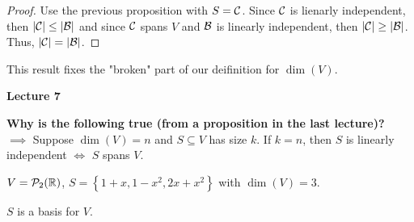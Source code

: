 \begin{proof}
    Use the previous proposition with $S = \mathcal{C}$. Since $\mathcal{C}$ is lienarly independent, then $|\mathcal{C}| \leq |\mathcal{B}|$
    and since $\mathcal{C}$ spans $V$ and $\mathcal{B}$ is linearly independent, then $|\mathcal{C}| \geq |\mathcal{B}|$. Thus, $|\mathcal{C}| = |\mathcal{B}|$.
\end{proof}

\begin{note}
    This result fixes the "broken" part of our deifinition for $\dim{(V)}$.
\end{note}

\makebox[\linewidth]{\hrulefill}
{\large \textbf{Lecture 7}}

\textbf{Why is the following true (from a proposition in the last lecture)?} \\
$\implies$ Suppose $\dim{(V)} = n$ and $S \subseteq V$ has size $k$. If $k=n$, then $S$ is linearly independent $\iff$ $S$ spans $V$.

\begin{example}
    $V=\mathcal{P}_2({\mathbb{R}})$, $S = \left\{ 1+x,1-x^2,2x+x^2 \right\}$ with $\dim{(V)} = 3$.
\end{example}

\begin{claim}
    $S$ is a basis for $V$.
\end{claim}

